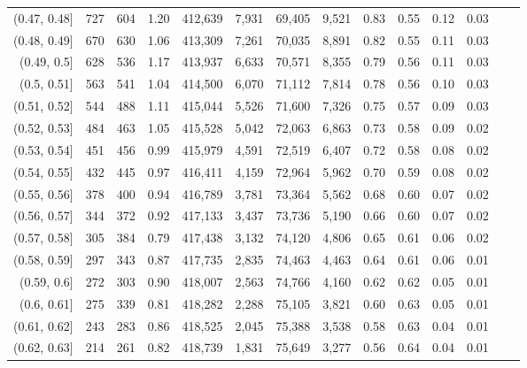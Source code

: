 \begin{tabular}{rrrrrrrrrrrrrr}
(0.47, 0.48]   &     727 &    604 &   1.20 &  412,639 &    7,931 &  69,405 &   9,521 &  0.83 &  0.55 &  0.12 &      0.03 \\
(0.48, 0.49]   &     670 &    630 &   1.06 &  413,309 &    7,261 &  70,035 &   8,891 &  0.82 &  0.55 &  0.11 &      0.03 \\
(0.49, 0.5]    &     628 &    536 &   1.17 &  413,937 &    6,633 &  70,571 &   8,355 &  0.79 &  0.56 &  0.11 &      0.03 \\
(0.5, 0.51]    &     563 &    541 &   1.04 &  414,500 &    6,070 &  71,112 &   7,814 &  0.78 &  0.56 &  0.10 &      0.03 \\
(0.51, 0.52]   &     544 &    488 &   1.11 &  415,044 &    5,526 &  71,600 &   7,326 &  0.75 &  0.57 &  0.09 &      0.03 \\
(0.52, 0.53]   &     484 &    463 &   1.05 &  415,528 &    5,042 &  72,063 &   6,863 &  0.73 &  0.58 &  0.09 &      0.02 \\
(0.53, 0.54]   &     451 &    456 &   0.99 &  415,979 &    4,591 &  72,519 &   6,407 &  0.72 &  0.58 &  0.08 &      0.02 \\
(0.54, 0.55]   &     432 &    445 &   0.97 &  416,411 &    4,159 &  72,964 &   5,962 &  0.70 &  0.59 &  0.08 &      0.02 \\
(0.55, 0.56]   &     378 &    400 &   0.94 &  416,789 &    3,781 &  73,364 &   5,562 &  0.68 &  0.60 &  0.07 &      0.02 \\
(0.56, 0.57]   &     344 &    372 &   0.92 &  417,133 &    3,437 &  73,736 &   5,190 &  0.66 &  0.60 &  0.07 &      0.02 \\
(0.57, 0.58]   &     305 &    384 &   0.79 &  417,438 &    3,132 &  74,120 &   4,806 &  0.65 &  0.61 &  0.06 &      0.02 \\
(0.58, 0.59]   &     297 &    343 &   0.87 &  417,735 &    2,835 &  74,463 &   4,463 &  0.64 &  0.61 &  0.06 &      0.01 \\
(0.59, 0.6]    &     272 &    303 &   0.90 &  418,007 &    2,563 &  74,766 &   4,160 &  0.62 &  0.62 &  0.05 &      0.01 \\
(0.6, 0.61]    &     275 &    339 &   0.81 &  418,282 &    2,288 &  75,105 &   3,821 &  0.60 &  0.63 &  0.05 &      0.01 \\
(0.61, 0.62]   &     243 &    283 &   0.86 &  418,525 &    2,045 &  75,388 &   3,538 &  0.58 &  0.63 &  0.04 &      0.01 \\
(0.62, 0.63]   &     214 &    261 &   0.82 &  418,739 &    1,831 &  75,649 &   3,277 &  0.56 &  0.64 &  0.04 &      0.01 \\

\end{tabular}
